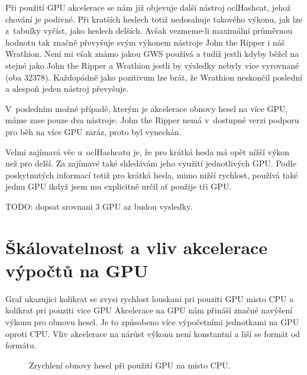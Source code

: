 Při použití GPU akcelerace se nám již objevuje další nástroj oclHashcat, jehož chování je
podivné. Při kratších heslech totiž nedosahuje takového výkonu, jak lze z~tabulky vyčíst, jako
heslech delších. Avšak vezmeme-li maximální průměrnou hodnotu tak značně převyšuje svým výkonem
nástroje John the Ripper i náš Wrathion. Není mi však známo jakou GWS používá a tudíž jestli
kdyby běžel na stejné jako John the Ripper a Wrathion jestli by výsledky nebyly více vyrovnané
(oba 32378). Každopádně jako pozitivum lze brát, že Wrathion neskončil poslední a alespoň jeden
nástroj převyšuje.

V~posledním možné případě, kterým je akcelerace obnovy hesel na více GPU, máme zase pouze dva
nástroje. John the Ripper nemá v~dostupné verzi podporu pro běh na více GPU zaráz, proto byl
vynechán. 

Velmi zajímavá věc u~oclHashcatu je, že pro krátká hesla má opět nížší výkon než pro delší. Za
zajímavé také shledávám jeho využití jednotlivých GPU. Podle poskytnutých informací totiž pro
krátká hesla, mimo nižší rychlost, používá také jednu GPU ikdyž jsem mu explicitně určil ať
použije tři GPU.

TODO: dopsat srovnani 3 GPU az budou vysledky.
\section{Škálovatelnost a vliv akcelerace výpočtů na GPU}
\label{sec:skalovatelnost}
Graf ukazujici kolikrat se zvysi rychlost louskani pri pouziti GPU misto CPU a kolikrat pri pouziti
vice GPU
Akcelerace na GPU nám přináší značné navýšení výkonu pro obnovu hesel. Je to způsobeno více
výpočetními jednotkami na GPU oproti CPU. Vliv akcelerace na nárůst výkonu není konstantní a liší
se formát od formátu.
\begin{center}
    \begin{figure}[ht]
	\caption{Zrychlení obnovy hesel při použití GPU na místo CPU.}
	\label{memory}
    \end{figure}
\end{center}


